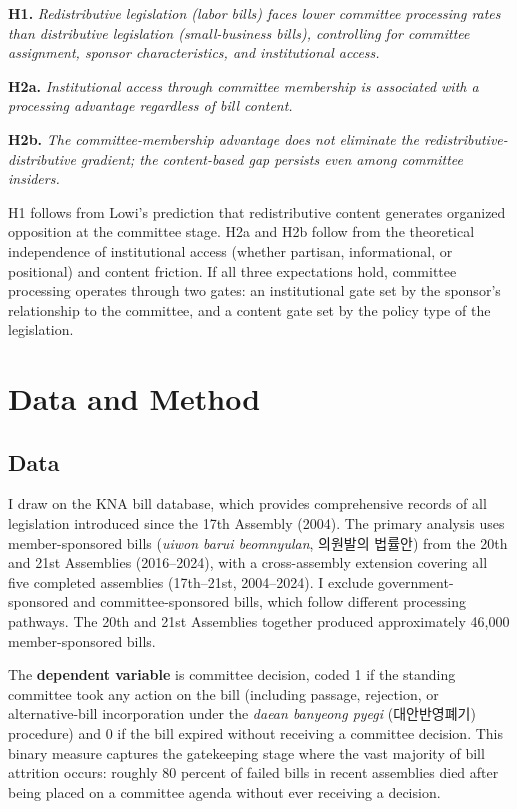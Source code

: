 \documentclass[11pt]{article}
\begin{document}
\medskip
\noindent\textbf{H1.} \textit{Redistributive legislation (labor bills) faces lower committee processing rates than distributive legislation (small-business bills), controlling for committee assignment, sponsor characteristics, and institutional access.}

\medskip
\noindent\textbf{H2a.} \textit{Institutional access through committee membership is associated with a processing advantage regardless of bill content.}

\medskip
\noindent\textbf{H2b.} \textit{The committee-membership advantage does not eliminate the redistributive-distributive gradient; the content-based gap persists even among committee insiders.}

\medskip
\noindent H1 follows from Lowi's prediction that redistributive content generates organized opposition at the committee stage. H2a and H2b follow from the theoretical independence of institutional access (whether partisan, informational, or positional) and content friction. If all three expectations hold, committee processing operates through two gates: an institutional gate set by the sponsor's relationship to the committee, and a content gate set by the policy type of the legislation.


\section{Data and Method}
\label{sec:method}

\subsection{Data}
\label{sec:data}

I draw on the KNA bill database, which provides comprehensive records of all legislation introduced since the 17th Assembly (2004). The primary analysis uses member-sponsored bills (\textit{uiwon barui beomnyulan}, 의원발의 법률안) from the 20th and 21st Assemblies (2016--2024), with a cross-assembly extension covering all five completed assemblies (17th--21st, 2004--2024). I exclude government-sponsored and committee-sponsored bills, which follow different processing pathways. The 20th and 21st Assemblies together produced approximately 46,000 member-sponsored bills.

The \textbf{dependent variable} is committee decision, coded 1 if the standing committee took any action on the bill (including passage, rejection, or alternative-bill incorporation under the \textit{daean banyeong pyegi} (대안반영폐기) procedure) and 0 if the bill expired without receiving a committee decision. This binary measure captures the gatekeeping stage where the vast majority of bill attrition occurs: roughly 80 percent of failed bills in recent assemblies died after being placed on a committee agenda without ever receiving a decision.
\end{document}

